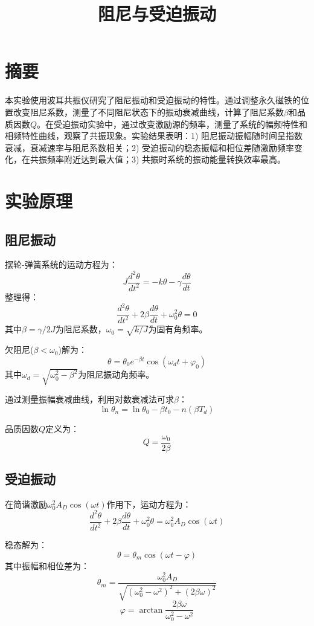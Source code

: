 \documentclass[UTF8]{ctexart}
\title{阻尼与受迫振动}
\author{}
\date{}
\begin{document}
\maketitle

\section{摘要}
本实验使用波耳共振仪研究了阻尼振动和受迫振动的特性。通过调整永久磁铁的位置改变阻尼系数，测量了不同阻尼状态下的振动衰减曲线，计算了阻尼系数$\beta$和品质因数$Q$。在受迫振动实验中，通过改变激励源的频率，测量了系统的幅频特性和相频特性曲线，观察了共振现象。实验结果表明：1) 阻尼振动振幅随时间呈指数衰减，衰减速率与阻尼系数相关；2) 受迫振动的稳态振幅和相位差随激励频率变化，在共振频率附近达到最大值；3) 共振时系统的振动能量转换效率最高。

\section{实验原理}
\subsection{阻尼振动}
摆轮-弹簧系统的运动方程为：
\[ J\frac{d^2\theta}{dt^2} = -k\theta - \gamma\frac{d\theta}{dt} \]
整理得：
\[ \frac{d^2\theta}{dt^2} + 2\beta\frac{d\theta}{dt} + \omega_0^2\theta = 0 \]
其中$\beta=\gamma/2J$为阻尼系数，$\omega_0=\sqrt{k/J}$为固有角频率。

欠阻尼($\beta<\omega_0$)解为：
\[ \theta = \theta_0 e^{-\beta t}\cos(\omega_d t + \varphi_0) \]
其中$\omega_d=\sqrt{\omega_0^2-\beta^2}$为阻尼振动角频率。

通过测量振幅衰减曲线，利用对数衰减法可求$\beta$：
\[ \ln\theta_n = \ln\theta_0 - \beta t_0 - n(\beta T_d) \]

品质因数$Q$定义为：
\[ Q = \frac{\omega_0}{2\beta} \]

\subsection{受迫振动}
在简谐激励$\omega_0^2A_D\cos(\omega t)$作用下，运动方程为：
\[ \frac{d^2\theta}{dt^2} + 2\beta\frac{d\theta}{dt} + \omega_0^2\theta = \omega_0^2A_D\cos(\omega t) \]

稳态解为：
\[ \theta = \theta_m\cos(\omega t - \varphi) \]
其中振幅和相位差为：
\[ \theta_m = \frac{\omega_0^2A_D}{\sqrt{(\omega_0^2-\omega^2)^2+(2\beta\omega)^2}} \]
\[ \varphi = \arctan\frac{2\beta\omega}{\omega_0^2-\omega^2} \]
\end{document}
